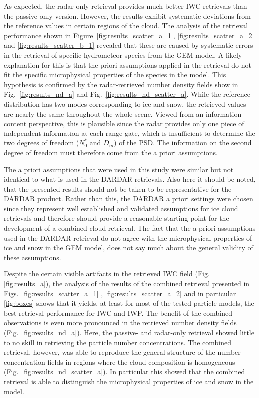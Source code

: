 \documentclass[journal abbreviation, manuscript]{copernicus}
\begin{document}
As expected, the radar-only retrieval provides much better IWC retrievals than
the passive-only version. However, the results exhibit systematic deviations
from the reference values in certain regions of the cloud. The analysis of the
retrieval performance shown in Figure~\ref{fig:results_scatter_a_1},
\ref{fig:results_scatter_a_2} and \ref{fig:results_scatter_b_1} revealed that
these are caused by systematic errors in the retrieval of specific hydrometeor
species from the GEM model. A likely explanation for this is that the priori
assumptions applied in the retrieval do not fit the specific microphysical
properties of the species in the model. This hypothesis is confirmed by the
radar-retrieved number density fields show in Fig.~\ref{fig:results_nd_a} and
Fig.~\ref{fig:results_nd_scatter_a}. While the reference distribution has two
modes corresponding to ice and snow, the retrieved values are nearly the same
throughout the whole scene. Viewed from an information content perspective, this
is plausible since the radar provides only one piece of independent information
at each range gate, which is insufficient to determine the two degrees of
freedom ($N_0^*$ and $D_m$) of the PSD. The information on the second degree of
freedom must therefore come from the a priori assumptions.

The a priori assumptions that were used in this study were similar but not
identical to what is used in the DARDAR retrievals. Also here it should be
noted, that the presented results should not be taken to be representative for
the DARDAR product. Rather than this, the DARDAR a priori settings were chosen
since they represent well established and validated assumptions for ice cloud
retrievals and therefore should provide a reasonable starting point for the
development of a combined cloud retrieval. The fact that the a priori
assumptions used in the DARDAR retrieval do not agree with the microphysical
properties of ice and snow in the GEM model, does not say much about the general
validity of these assumptions.

Despite the certain visible artifacts in the retrieved IWC field
(Fig. \ref{fig:results_a}), the analysis of the results of the combined retrieval
presented in Figs.~\ref{fig:results_scatter_a_1} , \ref{fig:results_scatter_a_2}
and in particular \ref{fig:boxes} shows that it yields, at least for most of the
tested particle models, the best retrieval performance for IWC and IWP. The
benefit of the combined observations is even more pronounced in the retrieved
number density fields (Fig.~\ref{fig:results_nd_a}). Here, the passive- and
radar-only retrieval showed little to no skill in retrieving the particle number
concentrations. The combined retrieval, however, was able to reproduce the
general structure of the number concentration fields in regions where the cloud
composition is homogeneous (Fig.~\ref{fig:results_nd_scatter_a}). In particular
this showed that the combined retrieval is able to distinguish the microphysical
properties of ice and snow in the model.
\end{document}
